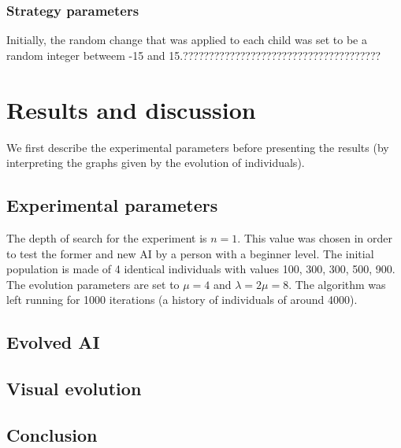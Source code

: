 \documentclass[11pt,a4paper,twocolumn]{article}
\begin{document}
\subsubsection{Strategy parameters}
Initially, the random change that was applied to each child was set to be a random integer betweem -15 and 15.??????????????????????????????????????

\section{Results and discussion}
We first describe the experimental parameters before presenting the results (by interpreting the graphs given by the evolution of individuals).

\subsection{Experimental parameters}
The depth of search for the experiment is $n = 1$. This value was chosen in order to test the former and new AI by a person with a beginner level. The initial population is made of 4 identical individuals with values 100, 300, 300, 500, 900. The evolution parameters are set to $\mu = 4$ and $\lambda = 2\mu = 8$. The algorithm was left running for 1000 iterations (a history of individuals of around 4000).

\subsection{Evolved AI}

\subsection{Visual evolution}
\subsection{Conclusion}



\end{document}
